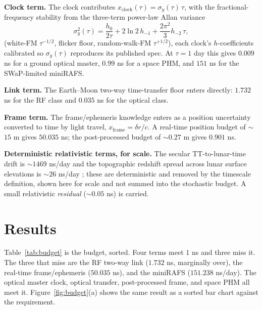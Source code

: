 \documentclass[conference]{IEEEtran}
\begin{document}
\textbf{Clock term.} The clock contributes $x_{\mathrm{clock}}(\tau) =
\sigma_y(\tau)\,\tau$, with the fractional-frequency stability from the three-term
power-law Allan variance
\begin{equation}
\sigma_y^2(\tau) = \frac{h_0}{2\tau} + 2\ln 2\, h_{-1}
+ \frac{2\pi^2}{3}h_{-2}\,\tau,
\label{eq:adev}
\end{equation}
(white-FM $\tau^{-1/2}$, flicker floor, random-walk-FM $\tau^{+1/2}$), each clock's
$h$-coefficients calibrated so $\sigma_y(\tau)$ reproduces its published spec. At
$\tau=1$ day this gives $0.009$ ns for a ground optical master, $0.99$ ns for a space
PHM, and $151$ ns for the SWaP-limited miniRAFS.

\textbf{Link term.} The Earth--Moon two-way time-transfer floor enters directly:
$1.732$ ns for the RF class and $0.035$ ns for the optical class.

\textbf{Frame term.} The frame/ephemeris knowledge enters as a position uncertainty
converted to time by light travel, $x_{\mathrm{frame}} = \delta r / c$. A real-time
position budget of $\sim$$15$ m gives $50.035$ ns; the post-processed budget of
$\sim$$0.27$ m gives $0.901$ ns.

\textbf{Deterministic relativistic terms, for scale.} The secular TT-to-lunar-time
drift is $\sim$$1469$ ns/day and the topographic redshift spread across lunar surface
elevations is $\sim$$26$ ns/day \cite{ashby2024,bourgoin2026}; these are deterministic
and removed by the timescale definition, shown here for scale and not summed into the
stochastic budget. A small relativistic \emph{residual} ($\sim$$0.05$ ns) is carried.

\section{Results}
\label{sec:results}
Table~\ref{tab:budget} is the budget, sorted. Four terms meet $1$ ns and three miss
it. The three that miss are the RF two-way link ($1.732$ ns, marginally over), the
real-time frame/ephemeris ($50.035$ ns), and the miniRAFS ($151.238$ ns/day). The
optical master clock, optical transfer, post-processed frame, and space PHM all meet
it. Figure~\ref{fig:budget}(a) shows the same result as a sorted bar chart against
the requirement.
\end{document}
